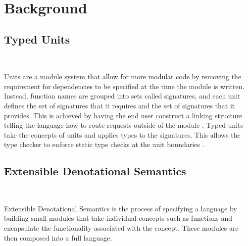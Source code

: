 
\section{Background}
\subsection{Typed Units}
~

Units are a module system that allow for more modular code by removing the requirement for dependencies to be specified at the time the module is written. Instead, function names are grouped into sets called signatures, and each unit defines the set of signatures that it requires and the set of signatures that it provides. This is achieved by having the end user construct a linking structure telling the language how to route requests outside of the module \cite{units}.
Typed units take the concepts of units and applies types to the signatures. This allows the type checker to enforce static type checks at the unit boundaries \cite{typed_units}.
\subsection{Extensible Denotational Semantics}
~

Extensible Denotational Semantics is the process of specifying a language by building small modules that take individual concepts such as functions and encapsulate the functionality associated with the concept. These modules are then composed into a full language\cite{eds}.